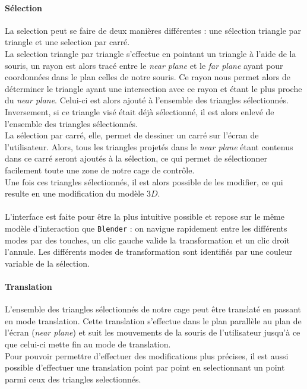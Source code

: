 \documentclass[10pt,a4paper]{article}
\begin{document}
\paragraph{Sélection}La selection peut se faire de deux manières différentes : une sélection triangle par triangle et une selection par carré.\\
La selection triangle par triangle s'effectue en pointant un triangle à l'aide de la souris, un rayon est alors tracé entre le \textit{near plane} et le \textit{far plane} ayant pour coordonnées dans le plan celles de notre souris. Ce rayon nous permet alors de déterminer le triangle ayant une intersection avec ce rayon et étant le plus proche du \textit{near plane}. Celui-ci est alors ajouté à l'ensemble des triangles sélectionnés. Inversement, si ce triangle visé était déjà sélectionné, il est alors enlevé de l'ensemble des triangles sélectionnés.\\
La sélection par carré, elle, permet de dessiner un carré sur l'écran de l'utilisateur. Alors, tous les triangles projetés dans le \textit{near plane} étant contenus dans ce carré seront ajoutés à la sélection, ce qui permet de sélectionner facilement toute une zone de notre cage de contrôle.\\
Une fois ces triangles sélectionnés, il est alors possible de les modifier, ce qui resulte en une modification du modèle $3D$.

\paragraph{}L'interface est faite pour être la plus intuitive possible et repose sur le même modèle d'interaction que \texttt{Blender} : on navigue rapidement entre les différents modes par des touches, un clic gauche valide la transformation et un clic droit l'annule.
Les différents modes de transformation sont identifiés par une couleur variable de la sélection.

\paragraph{Translation}L'ensemble des triangles sélectionnés de notre cage peut être translaté en passant en mode translation. Cette translation s'effectue dans le plan parallèle au plan de l'écran (\textit{near plane}) et suit les mouvements de la souris de l'utilisateur jusqu'à ce que celui-ci mette fin au mode de translation.\\
Pour pouvoir permettre d'effectuer des modifications plus précises, il est aussi possible d'effectuer une translation point par point en selectionnant un point parmi ceux des triangles selectionnés. 
\end{document}
